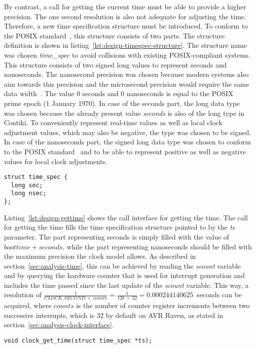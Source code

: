 By contrast, a call for getting the current time must be able to provide a higher precision.
The one second resolution is also not adequate for adjusting the time.
Therefore, a new time specification structure must be introduced.
To conform to the POSIX standard~\cite{posix}, this structure consists of two parts.
The structure definition is shown in listing~\ref{lst:design-timespec-structure}.
The structure name was chosen {\it{time\_spec}} to avoid collisions with existing POSIX-compliant systems.
This structure consists of two signed long values to represent seconds and nanoseconds.
The nanosecond precision was chosen because modern systems also aim towards this precision
and the microsecond precision would require the same data width~\cite{posix,ntp-precision}.
The value 0 seconds and 0 nanoseconds is equal to the POSIX prime epoch (1 January 1970).
In case of the seconds part, the long data type was chosen
because the already present value {\it{seconds}} is also of the long type in Contiki.
To conveniently represent real-time values as well as local clock adjustment values, which may also be negative,
the type was chosen to be signed.
In case of the nanoseconds part, the signed long data type was chosen
to conform to the POSIX standard~\cite{posix}
and to be able to represent positive as well as negative values for local clock adjustments.
\begin{lstlisting}[caption={Time specification structure},label={lst:design-timespec-structure}]
struct time_spec {
  long sec;
  long nsec;
};
\end{lstlisting}

Listing~\ref{lst:design-gettime} shows the call interface for getting the time.
The call for getting the time fills the time specification structure
pointed to by the {\it{ts}} parameter.
The part representing seconds is simply filled with the value of $boottime + seconds$,
while the part representing nanoseconds should be filled with the maximum precision
the clock model allows.
As described in section~\ref{sec:analysis-time},
this can be achieved by reading the {\it{scount}} variable
and by querying the hardware counter that is used for
interrupt generation and includes the time passed since
the last update of the {\it{scount}} variable.
This way, a resolution of
$\frac{1}{CLOCK\_SECOND~\times~counts} = \frac{1}{128~\times~32} = 0.000244140625$~seconds
can be acquired,
where $counts$ is the number of counter register increments between two successive interrupts,
which is 32 by default on AVR Raven, as stated in section~\ref{sec:analysis-clock-interface}.
\begin{lstlisting}[caption={Call interface for getting the time},label={lst:design-gettime}]
void clock_get_time(struct time_spec *ts);
\end{lstlisting}

